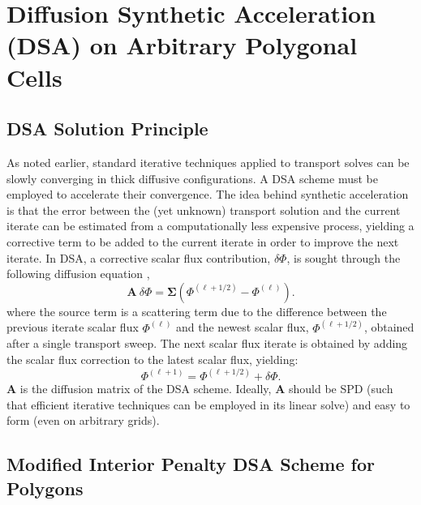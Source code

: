 \documentclass[preprint,10pt]{elsarticle}
\newcommand\bs{\boldsymbol}
\renewcommand{\(}{\left(}
\renewcommand{\)}{\right)}
\renewcommand{\[}{\left[}
\renewcommand{\]}{\right]}
\begin{document}
\section{Diffusion Synthetic Acceleration (DSA) on Arbitrary Polygonal Cells} \label{sec_mip}

\subsection{DSA Solution Principle}

As noted earlier, standard iterative techniques applied to transport solves 
can be slowly converging in thick diffusive configurations. A DSA scheme 
must be employed to accelerate their convergence.
The idea behind synthetic acceleration is that the error between the (yet
unknown) transport solution and the current iterate can be estimated from a
computationally less expensive process, yielding a corrective term to be added
to the current iterate in order to improve the next iterate. In DSA, a
corrective scalar flux contribution, $\delta \Phi$, is sought through the following 
diffusion equation \cite{dsa_ref}, 
%
\begin{equation}
  \bs{A}\ \delta \Phi = \bs{\Sigma}\(\Phi^{(\ell+1/2)} - \Phi^{(\ell)}\).
\end{equation}
%
where the source term is a scattering term due to the
difference between the previous iterate scalar flux $\Phi^{(\ell)}$ and the
newest scalar flux, $\Phi^{(\ell+1/2)}$, obtained after a single transport sweep. 
The next scalar flux iterate is obtained by adding the scalar flux correction to
the latest scalar flux, yielding:
%
\begin{equation}
  \Phi^{(\ell+1)} = \Phi^{(\ell+1/2)}+\delta \Phi.
\end{equation}
%
$\bs{A}$ is the diffusion matrix of the DSA scheme.
Ideally, $\bs{A}$ should be SPD (such that efficient iterative techniques can 
be employed in its linear solve) and easy to form (even on arbitrary grids).

\subsection{Modified Interior Penalty DSA Scheme for Polygons}
\end{document}
